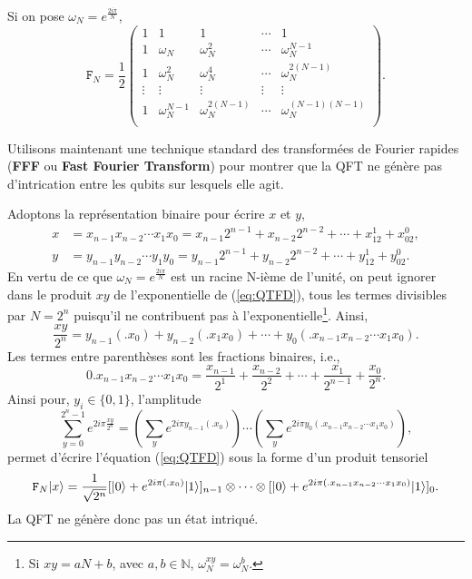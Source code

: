 Si on pose $\omega_N=e^{\frac{2i\pi}{N}}$,
\begin{equation}
\mathtt{F}_N=\frac{1}{2}\begin{pmatrix}
1 & 1 & 1 & \cdots & 1\\
1 & \omega_N & \omega_N^2 & \cdots & \omega_N^{N-1}\\
1 & \omega_N^2 & \omega_N^4 & \cdots & \omega_N^{2(N-1)}\\
\vdots & \vdots & \vdots & \vdots & \vdots\\
1 & \omega_N^{N-1} & \omega_N^{2(N-1)} & \cdots & \omega_N^{(N-1)(N-1)}\\
\end{pmatrix}.
\end{equation}

Utilisons maintenant une technique standard des transformées de Fourier
rapides (\textbf{FFF} ou \textbf{Fast Fourier Transform}) pour montrer que la
QFT ne génère pas d'intrication entre les qubits sur lesquels elle agit.

Adoptons la représentation binaire pour écrire $x$ et $y$,
\begin{subequations}%
\begin{align}
x & =x_{n-1}x_{n-2}\cdots x_1x_0=x_{n-1}2^{n-1}+x_{n-2}2^{n-2}+
\cdots+x_12^1+x_02^0,\\
y & =y_{n-1}y_{n-2}\cdots y_1y_0=y_{n-1}2^{n-1}+y_{n-2}2^{n-2}+
\cdots+y_12^1+y_02^0.
\end{align}
\end{subequations}
En vertu de ce que $\omega_N=e^{\frac{2i\pi}{N}}$ est un racine N-ième de
l'unité, on peut ignorer dans le produit $xy$ de l'exponentielle de
(\ref{eq:QTFD}), tous les termes divisibles par $N=2^n$ puisqu'il ne contribuent
pas à l'exponentielle\footnote{Si $xy=aN+b$, avec $a,b\in\mathbb{N}$,
$\omega_N^{xy}=\omega_N^b$.}. Ainsi,
\begin{equation}
 \frac{xy}{2^n}=y_{n-1}(.x_0)+y_{n-2}(.x_1x_0)+\cdots+y_0(.x_{n-1}x_{n-2}\cdots
x_1x_0).
\end{equation}
Les termes entre parenthèses sont les fractions binaires, i.e.,
\begin{equation}
 0.x_{n-1}x_{n-2}\cdots x_1x_0=\frac{x_{n-1}}{2^1}+\frac{x_{n-2}}{2^2}+\cdots+
\frac{x_1}{2^{n-1}}+\frac{x_0}{2^n}.
\end{equation}
Ainsi pour, $y_i\in\{0,1\}$, l'amplitude
\begin{equation}
 \sum_{y=0}^{2^n-1}e^{2i\pi\frac{xy}{2^n}}=\left(\sum_ye^{2i\pi y_{n-1}(.x_0)}
\right)\cdots\left(\sum_ye^{2i\pi y_0(.x_{n-1}x_{n-2}\cdots x_1x_0)}\right),
\end{equation}
permet d'écrire l'équation (\ref{eq:QTFD}) sous la forme d'un produit tensoriel
\begin{equation}
\label{eq:QTFD2}
\mathtt{F}_N\vert x\rangle=\frac{1}{\sqrt{2^n}}[\vert0\rangle+e^{2i\pi(.x_0)}
\vert1\rangle]_{n-1}\otimes\cdots\otimes[\vert0\rangle+e^{2i\pi(.x_{n-1}x_{n-2}\cdots
x_1x_0)} \vert1\rangle]_0.
\end{equation}
La QFT ne génère donc pas un état intriqué.

